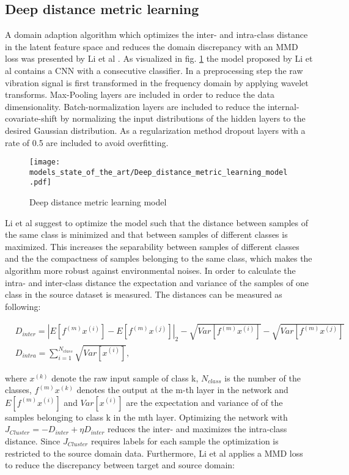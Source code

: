 \subsection{Deep distance metric learning}
A domain adaption algorithm which optimizes the inter- and intra-class distance in the latent feature space and reduces the domain discrepancy with an MMD loss was presented by Li et al \cite{Li2018}. As visualized in fig. \ref{fig:Deep_distance_metric_learning_model} the model proposed by Li et al contains a CNN with a consecutive classifier. In a preprocessing step the raw vibration signal is first transformed in the frequency domain by applying wavelet transforms. Max-Pooling layers are included in order to reduce the data dimensionality. Batch-normalization layers are included to reduce the internal-covariate-shift by normalizing the input distributions of the hidden layers to the desired Gaussian distribution. As a regularization method dropout layers with a rate of 0.5 are included to avoid overfitting. 

\begin{figure}[p]
  \centering
  \texttt{[image: models\_state\_of\_the\_art/Deep\_distance\_metric\_learning\_model.pdf]}
  \caption{Deep distance metric learning model \cite{Li2018}}
  \label{fig:Deep_distance_metric_learning_model}
\end{figure}

Li et al suggest to optimize the model such that the distance between samples of the same class is minimized and that between samples of different classes is maximized. This increases the separability between samples of different classes and the the compactness of samples belonging to the same class, which makes the algorithm more robust against environmental noises. In order to calculate the intra- and inter-class distance the expectation and variance of the samples of one class in the source dataset is measured. The distances can be measured as following:

\begin{equation}
    \begin{aligned}
       &D_{inter} = |E[f^{(m)}x^{(i)}]-E[f^{(m)}x^{(j)}]|_{2}-\sqrt{Var[f^{(m)}x^{(i)}]}-\sqrt{Var[f^{(m)}x^{(j)}]}\\
       &D_{intra} = 
        \sum_{i=1}^{N_{class}} \sqrt{Var[x^{(i)}]},
    \end{aligned}
\end{equation}

where $x^{(k)}$ denote the raw input sample of class k, $N_{class}$ is the number of the classes, $f^{(m)}x^{(k)}$ denotes the output at the m-th layer in the network and $E[f^{(m)}x^{(i)}]$ and $Var[x^{(i)}]$ are the  expectation and variance of of the samples belonging to class k in the mth layer. Optimizing the network with $J_{Cluster} = - D_{inter} + \eta D_{inter}$ reduces the inter- and maximizes the intra-class distance. Since $J_{Cluster}$  requires labels for each sample the optimization is restricted to the source domain data. Furthermore, Li et al applies a MMD loss to reduce the discrepancy between target and source domain: 

